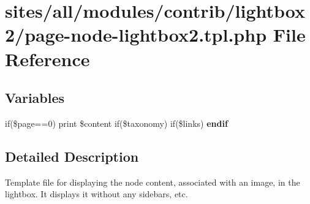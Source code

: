\hypertarget{page-node-lightbox2_8tpl_8php}{
\section{sites/all/modules/contrib/lightbox2/page-node-lightbox2.tpl.php File Reference}
\label{page-node-lightbox2_8tpl_8php}
}
\subsection*{Variables}
\begin{CompactItemize}
\item 
\hypertarget{page-node-lightbox2_8tpl_8php_3a9b74f198e76f3e0e71b1f94e660be6}{
if(\$page==0) print \$content if(\$taxonomy) if(\$links) \textbf{endif}}
\label{page-node-lightbox2_8tpl_8php_3a9b74f198e76f3e0e71b1f94e660be6}

\end{CompactItemize}


\subsection{Detailed Description}
Template file for displaying the node content, associated with an image, in the lightbox. It displays it without any sidebars, etc. 